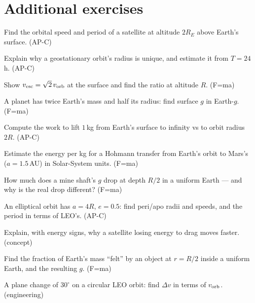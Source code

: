 \section*{Additional exercises}

\begin{exercise}[easy]
Find the orbital speed and period of a satellite at altitude $2R_E$
above Earth's surface. (AP-C)
\end{exercise}
\begin{exercise}[easy]
Explain why a geostationary orbit's radius is unique, and estimate it
from $T=24$\,h. (AP-C)
\end{exercise}
\begin{exercise}[easy]
Show $v_{\rm esc}=\sqrt2\,v_{\rm orb}$ at the surface and find the
ratio at altitude $R$. (F=ma)
\end{exercise}
\begin{exercise}[easy]
A planet has twice Earth's mass and half its radius: find surface $g$
in Earth-$g$. (F=ma)
\end{exercise}
\begin{exercise}[easy]
Compute the work to lift $1$\,kg from Earth's surface to infinity vs to
orbit radius $2R$. (AP-C)
\end{exercise}
\begin{exercise}[medium]
Estimate the energy per kg for a Hohmann transfer from Earth's orbit to
Mars's ($a=1.5$\,AU) in Solar-System units. (F=ma)
\end{exercise}
\begin{exercise}[medium]
How much does a mine shaft's $g$ drop at depth $R/2$ in a uniform Earth
--- and why is the real drop different? (F=ma)
\end{exercise}
\begin{exercise}[medium]
An elliptical orbit has $a=4R$, $e=0.5$: find peri/apo radii and
speeds, and the period in terms of LEO's. (AP-C)
\end{exercise}
\begin{exercise}[medium]
Explain, with energy signs, why a satellite losing energy to drag moves
faster. (concept)
\end{exercise}
\begin{exercise}[medium]
Find the fraction of Earth's mass ``felt'' by an object at $r=R/2$
inside a uniform Earth, and the resulting $g$. (F=ma)
\end{exercise}
\begin{exercise}[medium]
A plane change of $30^{\circ}$ on a circular LEO orbit: find $\Delta v$
in terms of $v_{\rm orb}$. (engineering)
\end{exercise}
